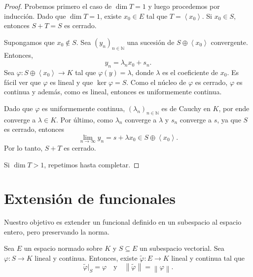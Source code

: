 \begin{proof}
	Probemos primero el caso de $\dim T = 1$ y luego procedemos por inducción. Dado que $\dim T = 1$, existe $x_0 \in E$ tal que $T = \left\langle x_0 \right\rangle$. Si $x_0 \in S$, entonces $S + T = S$ es cerrado.

	Supongamos que $x_0 \not \in S$. Sea $(y_n)_{n \in \mathbb{N}}$ una sucesión de $S \oplus \left\langle x_0 \right\rangle$ convergente. Entonces,
	\begin{equation*}
		y_n = \lambda_n x_0 + s_n.
	\end{equation*}
	Sea $\varphi : S \oplus \left\langle x_0 \right\rangle \to K$ tal que $\varphi(y) = \lambda$, donde $\lambda$ es el coeficiente de $x_0$. Es fácil ver que $\varphi$ es lineal y que $\ker \varphi = S$. Como el núcleo de $\varphi$ es cerrado, $\varphi$ es continua y además, como es lineal, entonces es uniformemente continua.

	Dado que $\varphi$ es uniformemente continua, $(\lambda_n)_{n \in \mathbb{N}}$ es de Cauchy en $K$, por ende converge a $\lambda \in K$. Por último, como $\lambda_n$ converge a $\lambda$ y $s_n$ converge a $s$, ya que $S$ es cerrado, entonces
	\begin{equation*}
		\lim_{n \to \infty} y_n = s + \lambda x_0 \in S \oplus \left\langle x_0 \right\rangle.
	\end{equation*}
	Por lo tanto, $S + T$ es cerrado.

	Si $\dim T > 1$, repetimos hasta completar.
\end{proof}


\section{Extensión de funcionales}

Nuestro objetivo es extender un funcional definido en un subespacio al espacio entero, pero preservando la norma.

\begin{theorem}
	Sea $E$ un espacio normado sobre $K$ y $S \subseteq E$ un subespacio vectorial. Sea $\varphi : S \to K$ lineal y continua. Entonces, existe $\tilde{\varphi} : E \to K$ lineal y continua tal que
	\begin{equation*}
		\tilde{\varphi}|_S = \varphi \quad \text{y} \quad \left\lVert \tilde{\varphi} \right\rVert = \left\lVert \varphi \right\rVert.
	\end{equation*}
\end{theorem}

